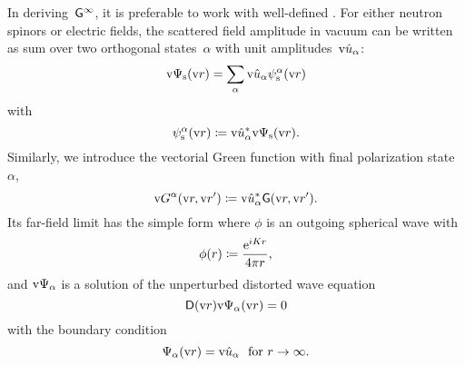 In deriving~$\mathsf{G}^\infty$, it is preferable to work with well-defined
.
%
For either neutron spinors or electric fields,
the scattered field amplitude in vacuum
can be written as sum over two orthogonal states~$\alpha$
%
with unit amplitudes~$\text{v}{\hat u}_\alpha$:
%
\begin{equation}
   \text{v}\Psi_\text{s}(\text{v}{r})
   = \sum_\alpha\text{v}{\hat u}_\alpha\psi_\text{s}^\alpha(\text{v}{r})
\end{equation}
with
\begin{equation}
  \psi_\text{s}^\alpha(\text{v}{r})
  \coloneqq \text{v}{\hat u}_\alpha^* \text{v}\Psi_\text{s}(\text{v}{r}).
\end{equation}
Similarly, we introduce the vectorial Green function with final polarization state~$\alpha$,
\begin{equation}
   \text{v}{G}^\alpha(\text{v}{r},\text{v}{r}')
   \coloneqq \text{v}{\hat u}_\alpha^* \mathsf{G}(\text{v}{r},\text{v}{r}').
\end{equation}
Its far-field limit has the simple form
where $\phi$ is an outgoing spherical wave with
\begin{equation}\label{Effphidef}
  \phi(r) \coloneqq \frac{\mathrm e^{iKr}}{4\pi r},
\end{equation}
and $\text{v}\Psi_\alpha$ is a solution of the unperturbed distorted wave equation
\begin{equation}
  \mathsf{D}(\text{v}{r})\text{v}\Psi_\alpha(\text{v}{r}) = 0
\end{equation}
with the boundary condition
\begin{equation}
  \Psi_\alpha(\text{v}{r}) = \text{v}{\hat u}_\alpha\text{~~for }r\to\infty.
\end{equation}

